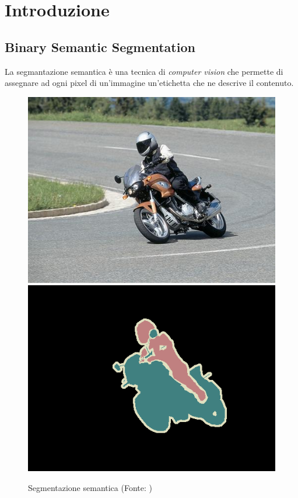 

\section{Introduzione}


\subsection{Binary Semantic Segmentation}

La segmantazione semantica è una tecnica di \textit{computer vision} che permette di assegnare ad ogni pixel di un'immagine un'etichetta che ne descrive il contenuto.

\begin{figure}[!ht]
	\begin{adjustbox}{width=0.6\columnwidth, center}
		\includegraphics{./images/segmantion_example_image.png} \includegraphics{./images/segmantion_example_mask.png}
	\end{adjustbox}
	\caption{Segmentazione semantica (Fonte: \cite{pascal-voc-2012})}
	\label{fig:segmantion_example}
\end{figure}


